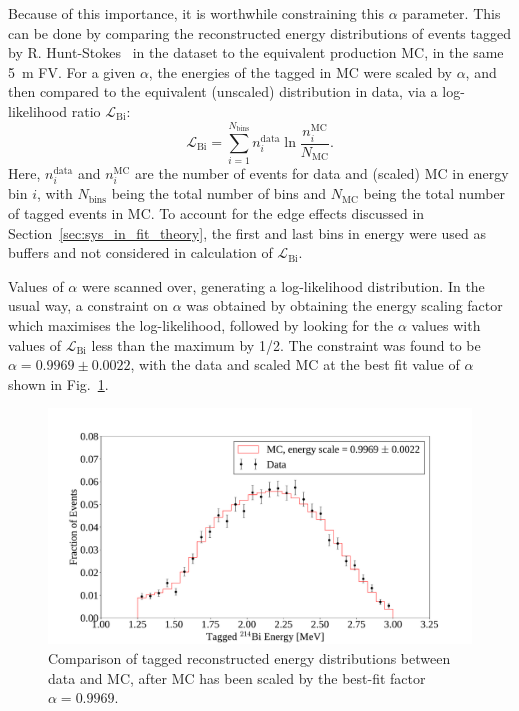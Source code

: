 Because of this importance, it is worthwhile constraining this $\alpha$ parameter. This can be done by comparing the reconstructed energy distributions of  events tagged by R. Hunt-Stokes~\cite{hunt-stokesPrivateCommunication2023} %
in the dataset to the equivalent production MC, in the same \SI{5}{\m} FV. For a given $\alpha$, the energies of the tagged  in MC were scaled by $\alpha$, and then compared to the equivalent (unscaled) distribution in data, via a log-likelihood ratio $\mathcal{L}_{\mathrm{Bi}}$:
\begin{equation}
    \mathcal{L}_{\mathrm{Bi}} = 
    \sum_{i=1}^{N_{\mathrm{bins}}}
        n_{i}^{\mathrm{data}}\ln{\frac{n_{i}^{\mathrm{MC}}}{N_{\mathrm{MC}}}}.
\end{equation}
Here, $n_{i}^{\mathrm{data}}$ and $n_{i}^{\mathrm{MC}}$ are the number of events for data and (scaled) MC in energy bin $i$, with $N_{\mathrm{bins}}$ being the total number of bins and $N_{\mathrm{MC}}$ being the total number of tagged events in MC. To account for the edge effects discussed in Section~\ref{sec:sys_in_fit_theory}, the first and last bins in energy were used as buffers and not considered in calculation of $\mathcal{L}_{\mathrm{Bi}}$.

Values of $\alpha$ were scanned over, generating a log-likelihood distribution. In the usual way, a constraint on $\alpha$ was obtained by obtaining the energy scaling factor which maximises the log-likelihood, followed by looking for the $\alpha$ values with values of $\mathcal{L}_{\mathrm{Bi}}$ less than the maximum by 1/2. The constraint was found to be $\alpha = 0.9969\pm0.0022$, with the data and scaled MC at the best fit value of $\alpha$ shown in Fig.~\ref{fig:bi214_escale_calibration}.

\begin{figure}
    \centering
    \includegraphics[width=\textwidth]{6_SolarAnalysis/images/rafael_tagged_bi214_data_vs_mc_energy_comparison_resized.pdf}
    \caption[Comparison of tagged  reconstructed energy distributions between data and MC]
    {Comparison of tagged  reconstructed energy distributions between data and MC, after MC has been scaled by the best-fit factor $\alpha = 0.9969$.}
    \label{fig:bi214_escale_calibration}
\end{figure}

